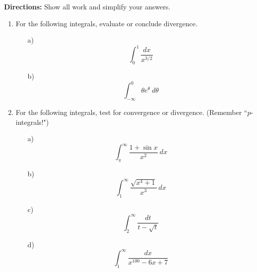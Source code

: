 \documentclass[12pt]{article}
\begin{document}
\textbf{Directions: } Show all work and simplify your answers.
\begin{enumerate}

\item For the following integrals, evaluate or conclude divergence.
\begin{itemize} 
\item[a)] $$\int_0^1 \dfrac{dx}{x^{3/2}}$$ \vfill
\item[b)] $$ \int_{-\infty}^0 \theta e^{\theta} \ d\theta$$
\vfill
\end{itemize}

\newpage
\item For the following integrals, test for convergence or divergence. (Remember ``$p$-integrals!")\\

\begin{itemize}
\item[a)] $$\int_{\pi}^{\infty} \frac{1+\sin x}{x^2} \ dx$$
\vfill
\item[b)] $$\int_1^{\infty} \frac{\sqrt{x^4+1}}{x^3} \ dx$$
\vfill
\item[c)] $$\int_2^{\infty} \dfrac{dt}{t-\sqrt{t}} $$
\vfill
\item[d)] $$ \int_1^{\infty} \dfrac{dx}{x^{100}-6x+7}$$
\vfill
\end{itemize}

\end{enumerate}
\end{document}
